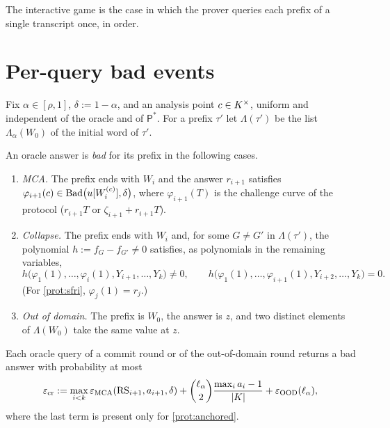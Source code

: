 The interactive game is the case in which the prover queries each prefix of a single
transcript once, in order.

\section{Per-query bad events}

Fix $\alpha\in[\rho,1]$, $\delta:=1-\alpha$, and an analysis point $c\in K^\times$, uniform
and independent of the oracle and of $\mathsf P^\ast$. For a prefix $\tau'$ let
$\Lambda(\tau')$ be the list $\Lambda_\alpha(W_0)$ of the initial word of $\tau'$.

\begin{definition}\label{def:bad-answer}
An oracle answer is \emph{bad} for its prefix in the following cases.
\begin{enumerate}[label=\textup{(\roman*)}]
\item \emph{MCA.} The prefix ends with $W_i$ and the answer $r_{i+1}$ satisfies
$\varphi_{i+1}(c)\in\mathrm{Bad}\bigl(u[W_i^{(c)}],\delta\bigr)$, where $\varphi_{i+1}(T)$ is the
challenge curve of the protocol ($r_{i+1}T$ or $\zeta_{i+1}+r_{i+1}T$).
\item \emph{Collapse.} The prefix ends with $W_i$ and, for some $G\ne G'$ in
$\Lambda(\tau')$, the polynomial $h:=f_G-f_{G'}\ne0$ satisfies, as polynomials in the
remaining variables,
\[
h\bigl(\varphi_1(1),\dots,\varphi_i(1),Y_{i+1},\dots,Y_k\bigr)\ne0,\qquad
h\bigl(\varphi_1(1),\dots,\varphi_{i+1}(1),Y_{i+2},\dots,Y_k\bigr)=0 .
\] \textup{(}For \cref{prot:sfri}, $\varphi_j(1)=r_j$.\textup{)}
\item \emph{Out of domain.} The prefix is $W_0$, the answer is $z$, and two distinct
elements of $\Lambda(W_0)$ take the same value at $z$.
\end{enumerate}
\end{definition}

\begin{lemma}\label{lem:per-query}
Each oracle query of a commit round or of the out-of-domain round returns a bad answer with
probability at most
\[
\varepsilon_{\mathrm{cr}}:=\max_{i<k}\varepsilon_{\mathrm{MCA}}(\mathrm{RS}_{i+1},a_{i+1},\delta)
+\binom{\ell_\alpha}2\frac{\max_ia_i-1}{|K|}+\varepsilon_{\mathrm{OOD}}(\ell_\alpha),
\]
where the last term is present only for \cref{prot:anchored}.
\end{lemma}

